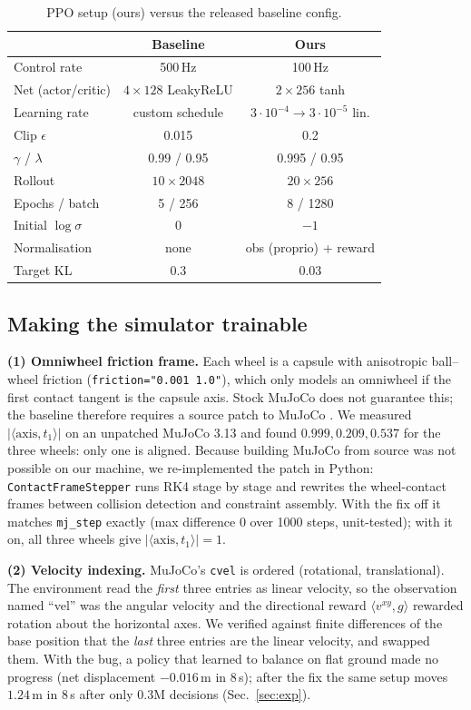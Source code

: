 \documentclass[conference]{IEEEtran}
\begin{document}
\begin{table}[t]
\centering\caption{PPO setup (ours) versus the released baseline config.}\label{tab:hp}
\small
\begin{tabular}{lcc}
\toprule
 & Baseline \cite{salehi2025code} & Ours \\
\midrule
Control rate & 500\,Hz & 100\,Hz \\
Net (actor/critic) & $4{\times}128$ LeakyReLU & $2{\times}256$ tanh \\
Learning rate & custom schedule & $3\!\cdot\!10^{-4}\!\to\!3\!\cdot\!10^{-5}$ lin. \\
Clip $\epsilon$ & 0.015 & 0.2 \\
$\gamma$ / $\lambda$ & 0.99 / 0.95 & 0.995 / 0.95 \\
Rollout & $10{\times}2048$ & $20{\times}256$ \\
Epochs / batch & 5 / 256 & 8 / 1280 \\
Initial $\log\sigma$ & 0 & $-1$ \\
Normalisation & none & obs (proprio) + reward \\
Target KL & 0.3 & 0.03 \\
\bottomrule
\end{tabular}
\end{table}

\subsection{Making the simulator trainable}\label{sec:method-physics}
\textbf{(1) Omniwheel friction frame.} Each wheel is a capsule with anisotropic ball--wheel friction (\texttt{friction="0.001 1.0"}), which only models an omniwheel if the first contact tangent is the capsule axis. Stock MuJoCo does not guarantee this; the baseline therefore requires a source patch to MuJoCo \cite{salehi2025code}. We measured $|\langle \text{axis}, t_1\rangle|$ on an unpatched MuJoCo 3.13 and found $0.999, 0.209, 0.537$ for the three wheels: only one is aligned. Because building MuJoCo from source was not possible on our machine, we re-implemented the patch in Python: \texttt{ContactFrameStepper} runs RK4 stage by stage and rewrites the wheel-contact frames between collision detection and constraint assembly. With the fix off it matches \texttt{mj\_step} exactly (max difference $0$ over 1000 steps, unit-tested); with it on, all three wheels give $|\langle \text{axis}, t_1\rangle|=1$.

\textbf{(2) Velocity indexing.} MuJoCo's \texttt{cvel} is ordered (rotational, translational). The environment read the \emph{first} three entries as linear velocity, so the observation named ``vel'' was the angular velocity and the directional reward $\langle v^{xy},g\rangle$ rewarded rotation about the horizontal axes. We verified against finite differences of the base position that the \emph{last} three entries are the linear velocity, and swapped them. With the bug, a policy that learned to balance on flat ground made no progress (net displacement $-0.016$\,m in 8\,s); after the fix the same setup moves $1.24$\,m in 8\,s after only 0.3M decisions (Sec.~\ref{sec:exp}).
\end{document}
